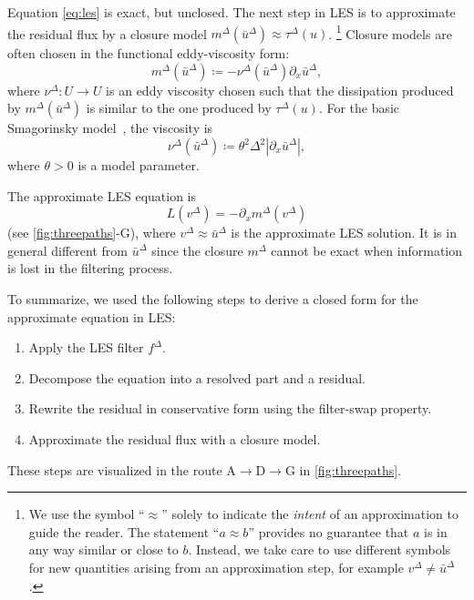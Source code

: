 \documentclass[preprint,twocolumn,5p]{elsarticle}
\begin{document}
Equation \eqref{eq:les} is exact, but unclosed.
The next step in LES is to approximate the residual flux by a closure model
$m^\Delta(\bar{u}^\Delta) \approx \tau^\Delta(u)$.
\footnote{
    We use the symbol ``$\approx$'' solely to indicate the \emph{intent} of an
    approximation to guide the reader.
    The statement ``$a \approx b$'' provides no guarantee that $a$ is in any
    way similar or close to $b$.
    Instead, we take care to use different symbols for new quantities arising
    from an approximation step, for example $v^\Delta \neq \bar{u}^\Delta$.
}
Closure models are often chosen in the functional eddy-viscosity form:
\begin{equation} \label{eq:smagorinsky}
    m^\Delta(\bar{u}^\Delta) \coloneq
    -\nu^\Delta(\bar{u}^\Delta) \partial_x \bar{u}^\Delta,
\end{equation}
where $\nu^\Delta : U \to U$ is an eddy viscosity
chosen such that
the dissipation produced by $m^\Delta(\bar{u}^\Delta)$ is similar
to the one produced by $\tau^\Delta(u)$.
For the basic Smagorinsky
model~\cite{smagorinskyGeneralCirculationExperiments1963}, the viscosity is
\begin{equation}
    \nu^\Delta(\bar{u}^\Delta) \coloneq \theta^2 \Delta^2 | \partial_x \bar{u}^\Delta |,
\end{equation}
where $\theta > 0$ is a model parameter.

The approximate LES equation is
\begin{equation} \label{eq:cl-conventional-les}
    L(v^\Delta) = -\partial_x m^\Delta(v^\Delta)
\end{equation}
(see \cref{fig:threepaths}-G),
where $v^\Delta \approx \bar{u}^\Delta$ is the approximate LES solution.
It is in general different from $\bar{u}^\Delta$ since the closure $m^\Delta$
cannot be exact when information is lost in the filtering process.



To summarize, we used the following steps to derive a closed form 
for the approximate equation in LES:
\begin{enumerate}
    \item Apply the LES filter $f^\Delta$.
    \item Decompose the equation into a resolved part and a residual.
    \item Rewrite the residual in conservative form using the filter-swap property.
    \item Approximate the residual flux with a closure model.
\end{enumerate}
These steps are visualized in the route A$\to$D$\to$G in \cref{fig:threepaths}.
\end{document}
